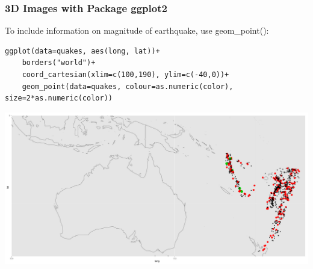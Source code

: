\begin{frame}
\frametitle{3D Images with Package \ttfamily ggplot2 \normalfont}

To include information on magnitude of earthquake, use \ttfamily geom\_point(): \normalfont 

\begin{lstlisting}
ggplot(data=quakes, aes(long, lat))+
	borders("world")+
	coord_cartesian(xlim=c(100,190), ylim=c(-40,0))+	
	geom_point(data=quakes, colour=as.numeric(color), size=2*as.numeric(color))
\end{lstlisting}

\newpage
       \begin{center}
		\includegraphics[scale=0.22]{images/ggplotPlot2.pdf}
	\end{center}
\end{frame}


